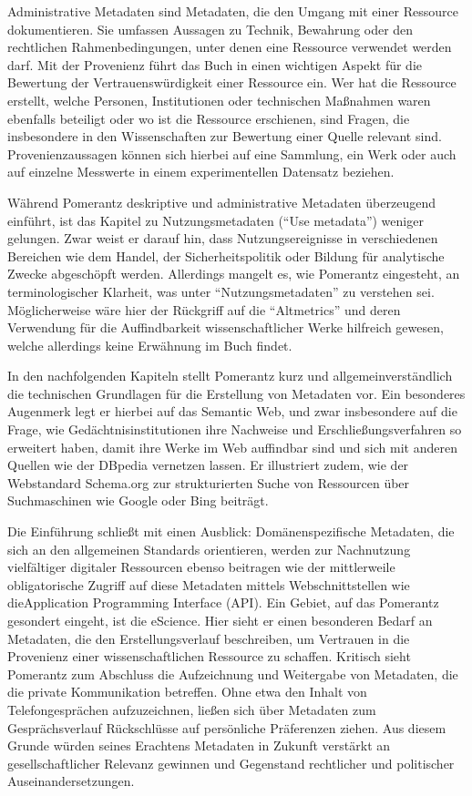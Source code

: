 \documentclass[a4paper,
fontsize=11pt,
oneside,
numbers=noperiodatend,
parskip=half-,
bibliography=totoc,
final
]{scrartcl}
\begin{document}
Administrative Metadaten sind Metadaten, die den Umgang mit einer
Ressource dokumentieren. Sie umfassen Aussagen zu Technik, Bewahrung
oder den rechtlichen Rahmenbedingungen, unter denen eine Ressource
verwendet werden darf. Mit der Provenienz führt das Buch in einen
wichtigen Aspekt für die Bewertung der Vertrauenswürdigkeit einer
Ressource ein. Wer hat die Ressource erstellt, welche Personen,
Institutionen oder technischen Maßnahmen waren ebenfalls beteiligt oder
wo ist die Ressource erschienen, sind Fragen, die insbesondere in den
Wissenschaften zur Bewertung einer Quelle relevant sind.
Provenienzaussagen können sich hierbei auf eine Sammlung, ein Werk oder
auch auf einzelne Messwerte in einem experimentellen Datensatz beziehen.

Während Pomerantz deskriptive und administrative Metadaten überzeugend
einführt, ist das Kapitel zu Nutzungsmetadaten (\enquote{Use metadata})
weniger gelungen. Zwar weist er darauf hin, dass Nutzungsereignisse in
verschiedenen Bereichen wie dem Handel, der Sicherheitspolitik oder
Bildung für analytische Zwecke abgeschöpft werden. Allerdings mangelt
es, wie Pomerantz eingesteht, an terminologischer Klarheit, was unter
\enquote{Nutzungsmetadaten} zu verstehen sei. Möglicherweise wäre hier
der Rückgriff auf die \enquote{Altmetrics} und deren Verwendung für die
Auffindbarkeit wissenschaftlicher Werke hilfreich gewesen, welche
allerdings keine Erwähnung im Buch findet.

In den nachfolgenden Kapiteln stellt Pomerantz kurz und
allgemeinverständlich die technischen Grundlagen für die Erstellung von
Metadaten vor. Ein besonderes Augenmerk legt er hierbei auf das Semantic
Web, und zwar insbesondere auf die Frage, wie Gedächtnisinstitutionen
ihre Nachweise und Erschließungsverfahren so erweitert haben, damit ihre
Werke im Web auffindbar sind und sich mit anderen Quellen wie der
DBpedia vernetzen lassen. Er illustriert zudem, wie der Webstandard
Schema.org zur strukturierten Suche von Ressourcen über Suchmaschinen
wie Google oder Bing beiträgt.

Die Einführung schließt mit einen Ausblick: Domänenspezifische
Metadaten, die sich an den allgemeinen Standards orientieren, werden zur
Nachnutzung vielfältiger digitaler Ressourcen ebenso beitragen wie der
mittlerweile obligatorische Zugriff auf diese Metadaten mittels
Webschnittstellen wie dieApplication Programming Interface (API). Ein
Gebiet, auf das Pomerantz gesondert eingeht, ist die eScience. Hier
sieht er einen besonderen Bedarf an Metadaten, die den
Erstellungsverlauf beschreiben, um Vertrauen in die Provenienz einer
wissenschaftlichen Ressource zu schaffen. Kritisch sieht Pomerantz zum
Abschluss die Aufzeichnung und Weitergabe von Metadaten, die die private
Kommunikation betreffen. Ohne etwa den Inhalt von Telefongesprächen
aufzuzeichnen, ließen sich über Metadaten zum Gesprächsverlauf
Rückschlüsse auf persönliche Präferenzen ziehen. Aus diesem Grunde
würden seines Erachtens Metadaten in Zukunft verstärkt an
gesellschaftlicher Relevanz gewinnen und Gegenstand rechtlicher und
politischer Auseinandersetzungen.
\end{document}
